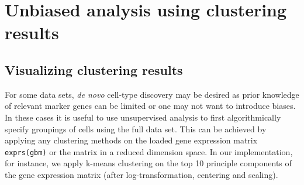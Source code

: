 \documentclass[10pt,oneside]{article}\usepackage[]{graphicx}\usepackage[]{color}
\begin{document}
\vspace{0.5in}
\section{Unbiased analysis using clustering results}
\subsection{Visualizing clustering results}
For some data sets, {\it de novo} cell-type discovery may be desired as prior knowledge of relevant marker genes can be limited or one may not want to introduce biases. In these cases it is useful to use unsupervised analysis to first algorithmically specify groupings of cells using the full data set. This can be achieved by applying any clustering methods on the loaded gene expression matrix \verb!exprs(gbm)! or the matrix in a reduced dimension space. In our implementation, for instance, we apply k-means clustering on the top 10 principle components of the gene expression matrix (after log-transformation, centering and scaling).
\end{document}
